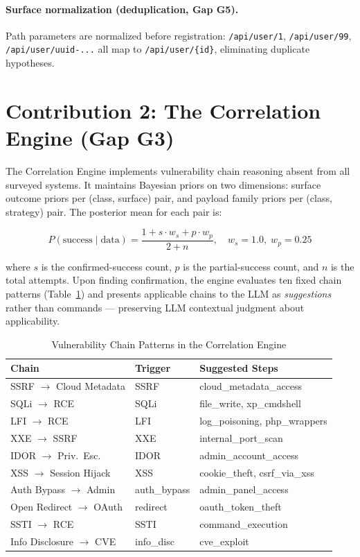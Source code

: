 \documentclass[12pt,a4paper,oneside,openany]{book}
\begin{document}
\paragraph{Surface normalization (deduplication, Gap G5).}
Path parameters are normalized before registration: \texttt{/api/user/1}, \texttt{/api/user/99}, \texttt{/api/user/uuid-...} all map to \texttt{/api/user/\{id\}}, eliminating duplicate hypotheses.

\section{Contribution 2: The Correlation Engine (Gap G3)}
\label{sec:correlation}

The Correlation Engine implements vulnerability chain reasoning absent from all surveyed systems. It maintains Bayesian priors on two dimensions: surface outcome priors per (class, surface) pair, and payload family priors per (class, strategy) pair. The posterior mean for each pair is:

\begin{equation}
P(\text{success} \mid \text{data}) = \frac{1 + s \cdot w_s + p \cdot w_p}{2 + n}, \quad w_s=1.0,\; w_p=0.25
\label{eq:bayes}
\end{equation}

where $s$ is the confirmed-success count, $p$ is the partial-success count, and $n$ is the total attempts. Upon finding confirmation, the engine evaluates ten fixed chain patterns (Table~\ref{tab:chains}) and presents applicable chains to the LLM as \textit{suggestions} rather than commands --- preserving LLM contextual judgment about applicability.

\begin{table}[H]
\centering
\caption{Vulnerability Chain Patterns in the Correlation Engine}
\label{tab:chains}
\begin{tabular}{lll}
\toprule
\textbf{Chain} & \textbf{Trigger} & \textbf{Suggested Steps} \\
\midrule
SSRF $\rightarrow$ Cloud Metadata  & SSRF        & cloud\_metadata\_access \\
SQLi $\rightarrow$ RCE             & SQLi        & file\_write, xp\_cmdshell \\
LFI $\rightarrow$ RCE              & LFI         & log\_poisoning, php\_wrappers \\
XXE $\rightarrow$ SSRF             & XXE         & internal\_port\_scan \\
IDOR $\rightarrow$ Priv.\ Esc.     & IDOR        & admin\_account\_access \\
XSS $\rightarrow$ Session Hijack   & XSS         & cookie\_theft, csrf\_via\_xss \\
Auth Bypass $\rightarrow$ Admin    & auth\_bypass& admin\_panel\_access \\
Open Redirect $\rightarrow$ OAuth  & redirect    & oauth\_token\_theft \\
SSTI $\rightarrow$ RCE             & SSTI        & command\_execution \\
Info Disclosure $\rightarrow$ CVE  & info\_disc  & cve\_exploit \\
\bottomrule
\end{tabular}
\end{table}
\end{document}
